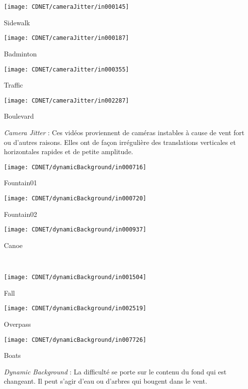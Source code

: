 	\begin{figureth}
		\begin{subfigureth}{0.24\textwidth}
			\texttt{[image: CDNET/cameraJitter/in000145]}\caption{Sidewalk}	
		\end{subfigureth}
		\begin{subfigureth}{0.24\textwidth}
			\texttt{[image: CDNET/cameraJitter/in000187]}\caption{Badminton}	
		\end{subfigureth}
		\begin{subfigureth}{0.24\textwidth}
			\texttt{[image: CDNET/cameraJitter/in000355]}\caption{Traffic}	
		\end{subfigureth}
		\begin{subfigureth}{0.24\textwidth}
			\texttt{[image: CDNET/cameraJitter/in002287]}\caption{Boulevard}	
		\end{subfigureth}
		\caption[categorie camera jitter]{\textit{Camera Jitter} : Ces vidéos proviennent de caméras instables à cause de vent fort ou d'autres raisons. Elles ont de façon irrégulière des translations verticales et horizontales  rapides et de petite amplitude.}\label{fig:cdnet:jitter}
	\end{figureth}

	\begin{figureth}
		\begin{subfigureth}{0.24\textwidth}
			\texttt{[image: CDNET/dynamicBackground/in000716]}\caption{Fountain01}	
		\end{subfigureth}
		\begin{subfigureth}{0.24\textwidth}
			\texttt{[image: CDNET/dynamicBackground/in000720]}\caption{Fountain02}	
		\end{subfigureth}
		\begin{subfigureth}{0.24\textwidth}
			\texttt{[image: CDNET/dynamicBackground/in000937]}\caption{Canoe}	
		\end{subfigureth}\\
		\begin{subfigureth}{0.24\textwidth}
			\texttt{[image: CDNET/dynamicBackground/in001504]}\caption{Fall}	
		\end{subfigureth}
		\begin{subfigureth}{0.24\textwidth}
			\texttt{[image: CDNET/dynamicBackground/in002519]}\caption{Overpass}	
		\end{subfigureth}
		\begin{subfigureth}{0.24\textwidth}
			\texttt{[image: CDNET/dynamicBackground/in007726]}\caption{Boats}	
		\end{subfigureth}
		\caption[Categorie Dynamic Background]{\textit{Dynamic Background} : La difficulté se porte sur le contenu du fond qui est changeant. Il peut s'agir d'eau ou d'arbres qui bougent dans le vent.}\label{fig:cdnet:dynamic}
	\end{figureth}

